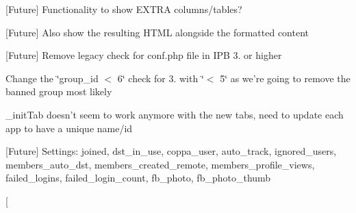 
\begin{DoxyRefList}
\item[\label{todo__todo000001}%
\hypertarget{todo__todo000001}{}%
Global \hyperlink{classadmin__core__diagnostics__diagnostics_a0b1e359fca7c29ddcb9c5700643b886b}{admin\-\_\-core\-\_\-diagnostics\-\_\-diagnostics\-:\-:\-\_\-db\-Check} ()]\mbox{[}Future\mbox{]} Functionality to show E\-X\-T\-R\-A columns/tables?  
\item[\label{todo__todo000002}%
\hypertarget{todo__todo000002}{}%
Global \hyperlink{classadmin__core__posts__bbcode_a8c8ab5861c50077303287bf4b0f7d2c3}{admin\-\_\-core\-\_\-posts\-\_\-bbcode\-:\-:\-\_\-bbcode\-Test} ()]\mbox{[}Future\mbox{]} Also show the resulting H\-T\-M\-L alongside the formatted content  
\item[\label{todo__todo000003}%
\hypertarget{todo__todo000003}{}%
Global \hyperlink{classadmin__core__tools__login_adb0564e0db51057be0ff35243f583d38}{admin\-\_\-core\-\_\-tools\-\_\-login\-:\-:\-\_\-login\-A\-C\-P\-Conf} ()]\mbox{[}Future\mbox{]} Remove legacy check for conf.\-php file in I\-P\-B 3. or higher  
\item[\label{todo__todo000008}%
\hypertarget{todo__todo000008}{}%
Global \hyperlink{classadmin__members__groups__groups_a0179865658ce56792937103bb601a5da}{admin\-\_\-members\-\_\-groups\-\_\-groups\-:\-:\-\_\-delete\-Form} ()]Change the \char`\"{}group\-\_\-id $<$ 6\char`\"{} check for 3. with \char`\"{}$<$ 5\char`\"{} as we're going to remove the banned group most likely  
\item[\label{todo__todo000009}%
\hypertarget{todo__todo000009}{}%
Global \hyperlink{classadmin__members__groups__groups_ab4bc5929dee17cb3d514e8865d78c434}{admin\-\_\-members\-\_\-groups\-\_\-groups\-:\-:\-\_\-group\-Form} (\$type='edit')]\-\_\-init\-Tab doesn't seem to work anymore with the new tabs, need to update each app to have a unique name/id  
\item[\label{todo__todo000010}%
\hypertarget{todo__todo000010}{}%
Global \hyperlink{classadmin__members__members__members_a1d10c6ca516165ce2ae94d7e023798a6}{admin\-\_\-members\-\_\-members\-\_\-members\-:\-:\-\_\-member\-View} ()]\mbox{[}Future\mbox{]} Settings\-: joined, dst\-\_\-in\-\_\-use, coppa\-\_\-user, auto\-\_\-track, ignored\-\_\-users, members\-\_\-auto\-\_\-dst, members\-\_\-created\-\_\-remote, members\-\_\-profile\-\_\-views, failed\-\_\-logins, failed\-\_\-login\-\_\-count, fb\-\_\-photo, fb\-\_\-photo\-\_\-thumb  
\item[\label{todo__todo000017}%
\hypertarget{todo__todo000017}{}%

\end{DoxyRefList}
